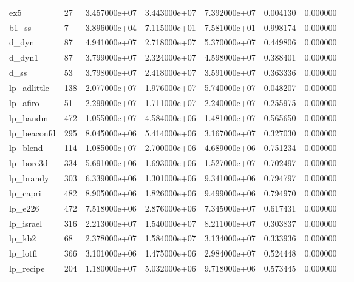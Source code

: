 \begin{tabular}{llrrrrrr}
ex5                     &   27 &  3.457000e+07 &  3.443000e+07 &  7.392000e+07 &  0.004130 &  0.000000 \\
b1\_ss                   &    7 &  3.896000e+04 &  7.115000e+01 &  7.581000e+01 &  0.998174 &  0.000000 \\
d\_dyn                   &   87 &  4.941000e+07 &  2.718000e+07 &  5.370000e+07 &  0.449806 &  0.000000 \\
d\_dyn1                  &   87 &  3.799000e+07 &  2.324000e+07 &  4.598000e+07 &  0.388401 &  0.000000 \\
d\_ss                    &   53 &  3.798000e+07 &  2.418000e+07 &  3.591000e+07 &  0.363336 &  0.000000 \\
lp\_adlittle             &  138 &  2.077000e+07 &  1.976000e+07 &  5.740000e+07 &  0.048207 &  0.000000 \\
lp\_afiro                &   51 &  2.299000e+07 &  1.711000e+07 &  2.240000e+07 &  0.255975 &  0.000000 \\
lp\_bandm                &  472 &  1.055000e+07 &  4.584000e+06 &  1.481000e+07 &  0.565650 &  0.000000 \\
lp\_beaconfd             &  295 &  8.045000e+06 &  5.414000e+06 &  3.167000e+07 &  0.327030 &  0.000000 \\
lp\_blend                &  114 &  1.085000e+07 &  2.700000e+06 &  4.689000e+06 &  0.751234 &  0.000000 \\
lp\_bore3d               &  334 &  5.691000e+06 &  1.693000e+06 &  1.527000e+07 &  0.702497 &  0.000000 \\
lp\_brandy               &  303 &  6.339000e+06 &  1.301000e+06 &  9.341000e+06 &  0.794797 &  0.000000 \\
lp\_capri                &  482 &  8.905000e+06 &  1.826000e+06 &  9.499000e+06 &  0.794970 &  0.000000 \\
lp\_e226                 &  472 &  7.518000e+06 &  2.876000e+06 &  7.345000e+07 &  0.617431 &  0.000000 \\
lp\_israel               &  316 &  2.213000e+07 &  1.540000e+07 &  8.211000e+07 &  0.303837 &  0.000000 \\
lp\_kb2                  &   68 &  2.378000e+07 &  1.584000e+07 &  3.134000e+07 &  0.333936 &  0.000000 \\
lp\_lotfi                &  366 &  3.101000e+06 &  1.475000e+06 &  2.984000e+07 &  0.524448 &  0.000000 \\
lp\_recipe               &  204 &  1.180000e+07 &  5.032000e+06 &  9.718000e+06 &  0.573445 &  0.000000 \\

\end{tabular}
